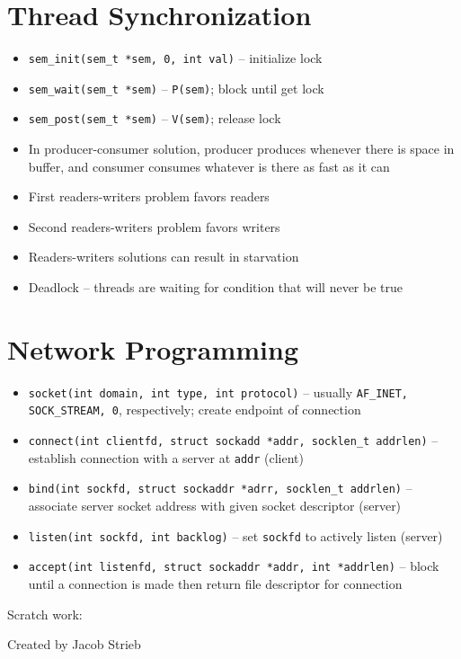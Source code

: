\documentclass[twocolumn]{article}
\begin{document}
\section{Thread Synchronization}
\begin{itemize}[noitemsep]
    \item \texttt{sem\_init(sem\_t *sem, 0, int val)} -- initialize lock
    \item \texttt{sem\_wait(sem\_t *sem)} -- \texttt{P(sem)}; block until get lock
    \item \texttt{sem\_post(sem\_t *sem)} -- \texttt{V(sem)}; release lock
    \item In producer-consumer solution, producer produces whenever there is space in buffer, and consumer consumes whatever is there as fast as it can
    \item First readers-writers problem favors readers
    \item Second readers-writers problem favors writers
    \item Readers-writers solutions can result in starvation
    \item Deadlock -- threads are waiting for condition that will never be true
\end{itemize}

\section{Network Programming}
\begin{itemize}[noitemsep]
    \item \texttt{socket(int domain, int type, int protocol)} -- usually \texttt{AF\_INET, SOCK\_STREAM, 0}, respectively; create endpoint of connection
    \item \texttt{connect(int clientfd, struct sockadd *addr, socklen\_t addrlen)} -- establish connection with a server at \texttt{addr} (client)
    \item \texttt{bind(int sockfd, struct sockaddr *adrr, socklen\_t addrlen)} -- associate server socket address with given socket descriptor (server)
    \item \texttt{listen(int sockfd, int backlog)} -- set \texttt{sockfd} to actively listen (server)
    \item \texttt{accept(int listenfd, struct sockaddr *addr, int *addrlen)} -- block until a connection is made then return file descriptor for connection
\end{itemize}

\vfill

Scratch work:

\vfill

\begin{center}
    Created by Jacob Strieb
\end{center}
\end{document}
